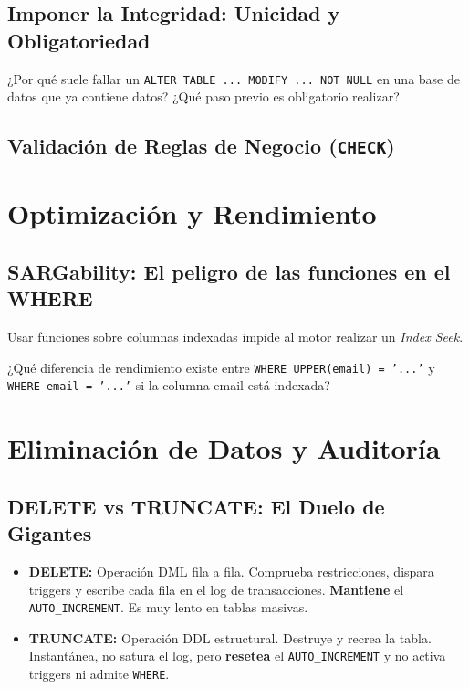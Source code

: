 \documentclass[12pt,a4paper]{article}
\begin{document}
\subsection{Imponer la Integridad: Unicidad y Obligatoriedad}


\begin{tcolorbox}[title=Reflexión 8]
¿Por qué suele fallar un \texttt{ALTER TABLE ... MODIFY ... NOT NULL} en una base de datos que ya contiene datos? ¿Qué paso previo es obligatorio realizar?
\end{tcolorbox}

\subsection{Validación de Reglas de Negocio (\texttt{CHECK})}


\section{Optimización y Rendimiento}
\subsection{SARGability: El peligro de las funciones en el WHERE}
Usar funciones sobre columnas indexadas impide al motor realizar un \textit{Index Seek}.



\begin{tcolorbox}[title=Reflexión 6]
¿Qué diferencia de rendimiento existe entre \texttt{WHERE UPPER(email) = '...'} y \texttt{WHERE email = '...'} si la columna email está indexada?
\end{tcolorbox}

\section{Eliminación de Datos y Auditoría}
\subsection{DELETE vs TRUNCATE: El Duelo de Gigantes}
\begin{itemize}
    \item \textbf{DELETE:} Operación DML fila a fila. Comprueba restricciones, dispara triggers y escribe cada fila en el log de transacciones. \textbf{Mantiene} el \texttt{AUTO\_INCREMENT}. Es muy lento en tablas masivas.
    \item \textbf{TRUNCATE:} Operación DDL estructural. Destruye y recrea la tabla. Instantánea, no satura el log, pero \textbf{resetea} el \texttt{AUTO\_INCREMENT} y no activa triggers ni admite \texttt{WHERE}.
\end{itemize}
\end{document}
